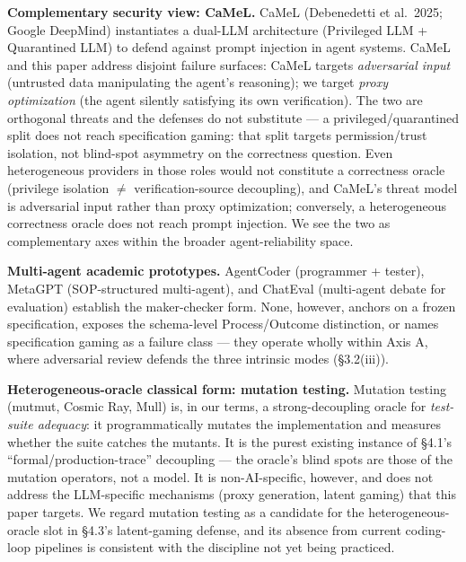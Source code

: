 \documentclass[
  11pt,
]{article}
\begin{document}
\textbf{Complementary security view: CaMeL.} CaMeL (Debenedetti et
al.~2025; Google DeepMind) instantiates a dual-LLM architecture
(Privileged LLM + Quarantined LLM) to defend against prompt injection in
agent systems. CaMeL and this paper address disjoint failure surfaces:
CaMeL targets \emph{adversarial input} (untrusted data manipulating the
agent's reasoning); we target \emph{proxy optimization} (the agent
silently satisfying its own verification). The two are orthogonal
threats and the defenses do not substitute --- a privileged/quarantined
split does not reach specification gaming: that split targets
permission/trust isolation, not blind-spot asymmetry on the correctness
question. Even heterogeneous providers in those roles would not
constitute a correctness oracle (privilege isolation $\neq$
verification-source decoupling), and CaMeL's threat model is adversarial
input rather than proxy optimization; conversely, a heterogeneous
correctness oracle does not reach prompt injection. We see the two as
complementary axes within the broader agent-reliability space.

\textbf{Multi-agent academic prototypes.} AgentCoder (programmer +
tester), MetaGPT (SOP-structured multi-agent), and ChatEval (multi-agent
debate for evaluation) establish the maker-checker form. None, however,
anchors on a frozen specification, exposes the schema-level
Process/Outcome distinction, or names specification gaming as a failure
class --- they operate wholly within Axis A, where adversarial review
defends the three intrinsic modes (§3.2(iii)).

\textbf{Heterogeneous-oracle classical form: mutation testing.} Mutation
testing (mutmut, Cosmic Ray, Mull) is, in our terms, a strong-decoupling
oracle for \emph{test-suite adequacy}: it programmatically mutates the
implementation and measures whether the suite catches the mutants. It is
the purest existing instance of §4.1's ``formal/production-trace''
decoupling --- the oracle's blind spots are those of the mutation
operators, not a model. It is non-AI-specific, however, and does not
address the LLM-specific mechanisms (proxy generation, latent gaming)
that this paper targets. We regard mutation testing as a candidate for
the heterogeneous-oracle slot in §4.3's latent-gaming defense, and its
absence from current coding-loop pipelines is consistent with the
discipline not yet being practiced.
\end{document}
